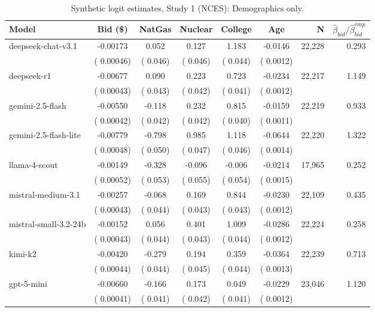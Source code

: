 \begin{table}[H]
\centering
\caption{Synthetic logit estimates, Study 1 (NCES): Demographics only.}
\label{tab:syn-logit-demonly}
\begin{threeparttable}
\footnotesize
\begin{tabular}{lcccccrr}
\toprule
Model & Bid (\$) & NatGas & Nuclear & College & Age & N & $\hat\beta_{bid}/\hat\beta_{bid}^{emp}$ \\
\midrule
deepseek-chat-v3.1 &  -0.00173 &   0.052 &   0.127 &   1.183 & -0.0146 &    22,228 &  0.293 \\
 & (  0.00046) & (  0.046) & (  0.046) & (  0.044) & ( 0.0012) & & \\
deepseek-r1 &  -0.00677 &   0.090 &   0.223 &   0.723 & -0.0234 &    22,217 &  1.149 \\
 & (  0.00043) & (  0.043) & (  0.042) & (  0.041) & ( 0.0012) & & \\
gemini-2.5-flash &  -0.00550 &  -0.118 &   0.232 &   0.815 & -0.0159 &    22,219 &  0.933 \\
 & (  0.00042) & (  0.042) & (  0.042) & (  0.040) & ( 0.0011) & & \\
gemini-2.5-flash-lite &  -0.00779 &  -0.798 &   0.985 &   1.118 & -0.0644 &    22,220 &  1.322 \\
 & (  0.00048) & (  0.050) & (  0.047) & (  0.046) & ( 0.0014) & & \\
llama-4-scout &  -0.00149 &  -0.328 &  -0.096 &  -0.006 & -0.0214 &    17,965 &  0.252 \\
 & (  0.00052) & (  0.053) & (  0.055) & (  0.054) & ( 0.0015) & & \\
mistral-medium-3.1 &  -0.00257 &  -0.068 &   0.169 &   0.844 & -0.0230 &    22,109 &  0.435 \\
 & (  0.00043) & (  0.044) & (  0.043) & (  0.043) & ( 0.0012) & & \\
mistral-small-3.2-24b &  -0.00152 &   0.056 &   0.401 &   1.009 & -0.0286 &    22,224 &  0.258 \\
 & (  0.00043) & (  0.044) & (  0.043) & (  0.044) & ( 0.0012) & & \\
kimi-k2 &  -0.00420 &  -0.279 &   0.194 &   0.359 & -0.0364 &    22,239 &  0.713 \\
 & (  0.00044) & (  0.044) & (  0.045) & (  0.044) & ( 0.0013) & & \\
gpt-5-mini &  -0.00660 &  -0.166 &   0.173 &   0.049 & -0.0229 &    23,046 &  1.120 \\
 & (  0.00041) & (  0.041) & (  0.042) & (  0.041) & ( 0.0012) & & \\

\end{tabular}
\end{threeparttable}
\end{table}
